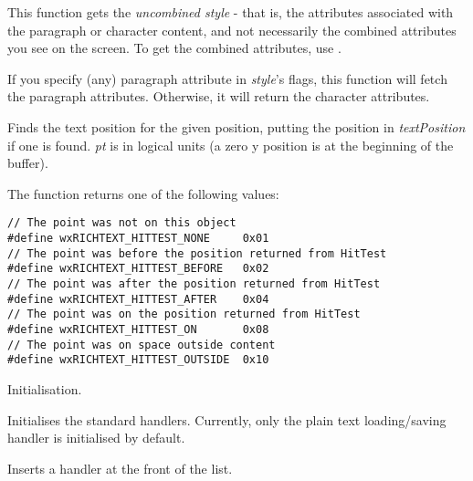 This function gets the {\it uncombined style} - that is, the attributes associated with the
paragraph or character content, and not necessarily the combined attributes you see on the
screen. To get the combined attributes, use .

If you specify (any) paragraph attribute in {\it style}'s flags, this function will fetch
the paragraph attributes. Otherwise, it will return the character attributes.

\label{wxrichtextbufferhittest}


Finds the text position for the given position, putting the position in {\it textPosition} if
one is found. {\it pt} is in logical units (a zero y position is
at the beginning of the buffer).

The function returns one of the following values:

{\small
\begin{verbatim}
// The point was not on this object
#define wxRICHTEXT_HITTEST_NONE     0x01
// The point was before the position returned from HitTest
#define wxRICHTEXT_HITTEST_BEFORE   0x02
// The point was after the position returned from HitTest
#define wxRICHTEXT_HITTEST_AFTER    0x04
// The point was on the position returned from HitTest
#define wxRICHTEXT_HITTEST_ON       0x08
// The point was on space outside content
#define wxRICHTEXT_HITTEST_OUTSIDE  0x10
\end{verbatim}
}

\label{wxrichtextbufferinit}


Initialisation.

\label{wxrichtextbufferinitstandardhandlers}


Initialises the standard handlers. Currently, only the plain text loading/saving handler
is initialised by default.

\label{wxrichtextbufferinserthandler}


Inserts a handler at the front of the list.

